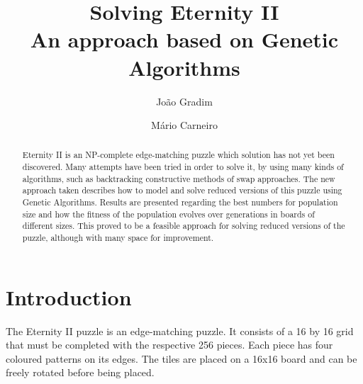 \documentclass{llncs}
\begin{document}
%
\frontmatter          %
%
\pagestyle{headings}  %
%

\mainmatter              %
%
\title{Solving Eternity II\\
    \small{An approach based on Genetic Algorithms}
  }
  \author{João Gradim \and Mário Carneiro}
%
%

\maketitle              %

\begin{abstract}

Eternity II is an NP-complete edge-matching puzzle which solution has not yet been discovered. Many attempts have been tried in order to solve it, by using many kinds of algorithms, such as backtracking constructive methods of swap approaches. The new approach taken describes how to model and solve reduced versions of this puzzle using Genetic Algorithms. Results are presented regarding the best numbers for population size and how the fitness of the population evolves over generations in boards of different sizes. This proved to be a feasible approach for solving reduced versions of the puzzle, although with many space for improvement.

\end{abstract}
%
\section{Introduction}\label{sec:introduction}

The Eternity II puzzle is an edge-matching puzzle. It consists of a 16 by 16 grid that must be completed with the respective 256 pieces. Each piece has four coloured patterns on its edges. The tiles are placed on a 16x16 board and can be freely rotated before being placed.
\end{document}

